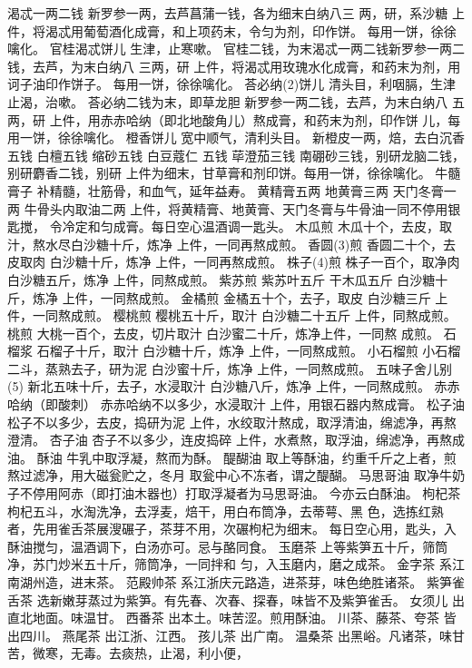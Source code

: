 \documentclass[12pt,UTF8]{ctexbook}
\begin{document}
渴忒一两二钱 新罗参一两，去芦菖蒲一钱，各为细末白纳八三
两，研，系沙糖
上件，将渴忒用葡萄酒化成膏，和上项药末，令匀为剂，印作饼。
每用一饼，徐徐噙化。
官桂渴忒饼儿 生津，止寒嗽。
官桂二钱，为末渴忒一两二钱新罗参一两二钱，去芦，为末白纳八
三两，研
上件，将渴忒用玫瑰水化成膏，和药末为剂，用诃子油印作饼子。
每用一饼，徐徐噙化。
荅必纳(2)饼儿 清头目，利咽膈，生津止渴，治嗽。
荅必纳二钱为末，即草龙胆 新罗参一两二钱，去芦，为末白纳八
五两，研
上件，用赤赤哈纳（即北地酸角儿）熬成膏，和药末为剂，印作饼
儿，每用一饼，徐徐噙化。
橙香饼儿 宽中顺气，清利头目。
新橙皮一两，焙，去白沉香五钱 白檀五钱 缩砂五钱 白豆蔻仁
五钱 荜澄茄三钱 南硼砂三钱，别研龙脑二钱，别研麝香二钱，别研
上件为细末，甘草膏和剂印饼。每用一饼，徐徐噙化。
牛髓膏子 补精髓，壮筋骨，和血气，延年益寿。
黄精膏五两 地黄膏三两 天门冬膏一两 牛骨头内取油二两
上件，将黄精膏、地黄膏、天门冬膏与牛骨油一同不停用银匙搅，
令冷定和匀成膏。每日空心温酒调一匙头。
木瓜煎
木瓜十个，去皮，取汁，熬水尽白沙糖十斤，炼净
上件，一同再熬成煎。
香圆(3)煎
香圆二十个，去皮取肉 白沙糖十斤，炼净
上件，一同再熬成煎。
株子(4)煎
株子一百个，取净肉 白沙糖五斤，炼净
上件，同熬成煎。
紫苏煎
紫苏叶五斤 干木瓜五斤 白沙糖十斤，炼净
上件，一同熬成煎。
金橘煎
金橘五十个，去子，取皮 白沙糖三斤
上件，一同熬成煎。
樱桃煎
樱桃五十斤，取汁 白沙糖二十五斤
上件，同熬成煎。
桃煎
大桃一百个，去皮，切片取汁 白沙蜜二十斤，炼净上件，一同熬
成煎。
石榴浆
石榴子十斤，取汁 白沙糖十斤，炼净
上件，一同熬成煎。
小石榴煎
小石榴二斗，蒸熟去子，研为泥 白沙蜜十斤，炼净
上件，一同熬成煎。
五味子舍儿别(5)
新北五味十斤，去子，水浸取汁 白沙糖八斤，炼净
上件，一同熬成煎。
赤赤哈纳（即酸刺）
赤赤哈纳不以多少，水浸取汁
上件，用银石器内熬成膏。
松子油
松子不以多少，去皮，捣研为泥
上件，水绞取汁熬成，取浮清油，绵滤净，再熬澄清。
杏子油
杏子不以多少，连皮捣碎
上件，水煮熬，取浮油，绵滤净，再熬成油。
酥油
牛乳中取浮凝，熬而为酥。
醍醐油
取上等酥油，约重千斤之上者，煎熬过滤净，用大磁瓮贮之，冬月
取瓮中心不冻者，谓之醍醐。
马思哥油
取净牛奶子不停用阿赤（即打油木器也）打取浮凝者为马思哥油。
今亦云白酥油。
枸杞茶
枸杞五斗，水淘洗净，去浮麦，焙干，用白布筒净，去蒂萼、黑
色，选拣红熟者，先用雀舌茶展溲碾子，茶芽不用，次碾枸杞为细末。
每日空心用，匙头，入酥油搅匀，温酒调下，白汤亦可。忌与酪同食。
玉磨茶
上等紫笋五十斤，筛筒净，苏门炒米五十斤，筛筒净，一同拌和
匀，入玉磨内，磨之成茶。
金字茶
系江南湖州造，进末茶。
范殿帅茶
系江浙庆元路造，进茶芽，味色绝胜诸茶。
紫笋雀舌茶
选新嫩芽蒸过为紫笋。有先春、次春、探春，味皆不及紫笋雀舌。
女须儿
出直北地面。味温甘。
西番茶
出本土。味苦涩。煎用酥油。
川茶、藤茶、夸茶
皆出四川。
燕尾茶
出江浙、江西。
孩儿茶
出广南。
温桑茶
出黑峪。凡诸茶，味甘苦，微寒，无毒。去痰热，止渴，利小便，
\end{document}
